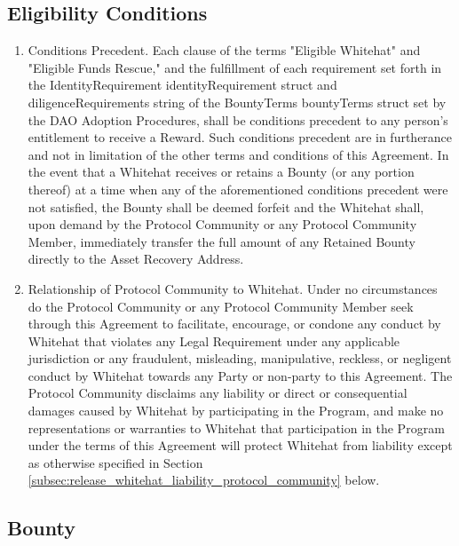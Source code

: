 \documentclass{article}
\begin{document}
\subsection{Eligibility Conditions}\label{subsec:eligibility_conditions}

\begin{enumerate}[label=\Alph*.]

    \item Conditions Precedent. Each clause of the terms "Eligible Whitehat" and "Eligible Funds Rescue," and the fulfillment of each requirement set forth in the IdentityRequirement identityRequirement struct and diligenceRequirements string of the BountyTerms bountyTerms struct set by the DAO Adoption Procedures, shall be conditions precedent to any person's entitlement to receive a Reward. Such conditions precedent are in furtherance and not in limitation of the other terms and conditions of this Agreement. In the event that a Whitehat receives or retains a Bounty (or any portion thereof) at a time when any of the aforementioned conditions precedent were not satisfied, the Bounty shall be deemed forfeit and the Whitehat shall, upon demand by the Protocol Community or any Protocol Community Member, immediately transfer the full amount of any Retained Bounty directly to the Asset Recovery Address.

    \item Relationship of Protocol Community to Whitehat. Under no circumstances do the Protocol Community or any Protocol Community Member seek through this Agreement to facilitate, encourage, or condone any conduct by Whitehat that violates any Legal Requirement under any applicable jurisdiction or any fraudulent, misleading, manipulative, reckless, or negligent conduct by Whitehat towards any Party or non-party to this Agreement. The Protocol Community disclaims any liability or direct or consequential damages caused by Whitehat by participating in the Program, and make no representations or warranties to Whitehat that participation in the Program under the terms of this Agreement will protect Whitehat from liability except as otherwise specified in Section \ref{subsec:release_whitehat_liability_protocol_community} below.

\end{enumerate}

\subsection{Bounty}\label{subsec:bounty}
\end{document}
